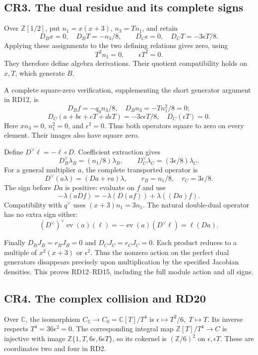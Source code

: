 \documentclass[
]{article}
\begin{document}
\subsection{CR3. The dual residue and its complete
signs}\label{cr3.-the-dual-residue-and-its-complete-signs}

Over \(\mathbb Z[1/2]\), put \(n_1=x(x+3)\), \(n_3=Tn_1\), and retain \[
D_Bx=0,\quad D_BT=-n_3/8,\qquad
D_C\epsilon=0,\quad D_CT=-3\epsilon T/8.
\] Applying these assignments to the two defining relations gives zero,
using \[
T^2n_1=0,\qquad \epsilon T^2=0.
\] They therefore define algebra derivations. Their quotient
compatibility holds on \(x,T\), which generate \(B\).

A complete square-zero verification, supplementing the short generator
argument in RD12, is \[
D_Bf=-q_0n_3/8,\quad D_Bn_3=-Tn_1^2/8=0;
\] \[
D_C(a+b\epsilon+cT+d\epsilon T)=-3c\epsilon T/8,\quad
D_C(\epsilon T)=0.
\] Here \(xn_3=0\), \(n_1^2=0\), and \(\epsilon^2=0\). Thus both
operators square to zero on every element. Their images also have square
zero.

Define \(D^\vee\ell=-\ell\circ D\). Coefficient extraction gives \[
D_B^\vee\lambda_B=(n_1/8)\lambda_B,\qquad
D_C^\vee\lambda_C=(3\epsilon/8)\lambda_C.
\] For a general multiplier \(a\), the complete transported operator is
\[
D^\vee(a\lambda)=(Da+ra)\lambda,\qquad
r_B=n_1/8,\quad r_C=3\epsilon/8.
\] The sign before \(Da\) is positive: evaluate on \(f\) and use \[
-\lambda(aDf)=-\lambda(D(af))+\lambda((Da)f).
\] Compatibility with \(q^\vee\) uses \((x+3)n_1=3n_1\). The natural
double-dual operator has no extra sign either: \[
(D^\vee)^\vee\operatorname{ev}(a)(\ell)
=-\operatorname{ev}(a)(D^\vee\ell)=\ell(Da).
\]

Finally \(D_BJ_B=r_BJ_B=0\) and \(D_CJ_C=r_CJ_C=0\). Each product
reduces to a multiple of \(x^2(x+3)\) or \(\epsilon^2\). Thus the
nonzero action on the perfect dual generators disappears precisely upon
multiplication by the specified Jacobian densities. This proves
RD12--RD15, including the full module action and all signs.

\subsection{CR4. The complex collision and
RD20}\label{cr4.-the-complex-collision-and-rd20}

Over \(\mathbb C\), the isomorphism
\(C_{\mathbb C}\to C_0=\mathbb C[T]/T^4\) is
\(\epsilon\mapsto T^2/6,\;T\mapsto T\). Its inverse respects
\(T^4=36\epsilon^2=0\). The corresponding integral map
\(\mathbb Z[T]/T^4\to C\) is injective with image
\(\mathbb Z\{1,T,6\epsilon,6\epsilon T\}\), so its cokernel is
\((\mathbb Z/6)^2\) on \textbf{\(\epsilon,\epsilon T\)}. These are
coordinates two and four in RD2.
\end{document}
